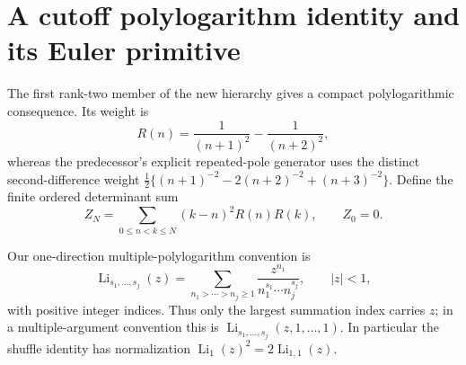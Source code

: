 \section{A cutoff polylogarithm identity and its Euler primitive}
\label{hier:gf-section}

The first rank-two member of the new hierarchy gives a compact
polylogarithmic consequence.  Its weight is
\begin{equation}\label{hier:gf-weight}
 R(n)=\frac1{(n+1)^2}-\frac1{(n+2)^2},
\end{equation}
whereas the predecessor's explicit repeated-pole generator uses the
distinct second-difference weight
$\tfrac12\{(n+1)^{-2}-2(n+2)^{-2}+(n+3)^{-2}\}$.
Define the finite ordered determinant sum
\begin{equation}\label{hier:gf-cutoff}
 Z_N=\sum_{0\le n<k\le N}(k-n)^2R(n)R(k),\qquad Z_0=0.
\end{equation}

Our one-direction multiple-polylogarithm convention is
\begin{equation}\label{hier:gf-convention}
 \operatorname{Li}_{s_1,\ldots,s_j}(z)
 =\sum_{n_1>\cdots>n_j\ge1}
       \frac{z^{n_1}}{n_1^{s_1}\cdots n_j^{s_j}},
 \qquad |z|<1,
\end{equation}
with positive integer indices.  Thus only the largest summation index
carries $z$; in a multiple-argument convention this is
$\operatorname{Li}_{s_1,\ldots,s_j}(z,1,\ldots,1)$.
In particular the shuffle identity has normalization
$\operatorname{Li}_1(z)^2=2\operatorname{Li}_{1,1}(z)$.

